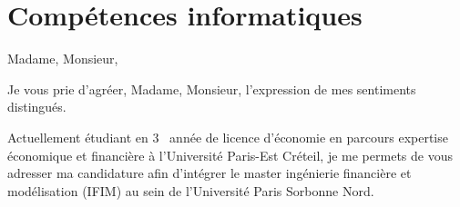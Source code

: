 \documentclass[11pt,a4paper,french]{moderncv}        %
\begin{document}
\section{Compétences informatiques}
\clearpage
\date{A Créteil, le 18 mars 2024}
\opening{Madame, Monsieur,}
\closing{Je vous prie d’agréer, Madame, Monsieur, l’expression de mes sentiments distingués.}
\makelettertitle
\justifying

\hspace*{1cm}
Actuellement étudiant en 3 \ieme ~année de licence d’économie en parcours expertise économique et financière à l’Université Paris-Est Créteil, je me permets de vous adresser ma candidature afin d’intégrer le master ingénierie financière et modélisation (IFIM) au sein de l'Université Paris Sorbonne Nord.
\end{document}
